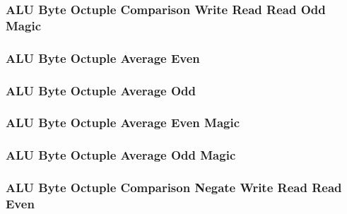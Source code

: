 \subsubsection[{\small ALU Byte Octuple Comparison Write Read Read Odd Magic}]{ALU Byte Octuple Comparison Write Read Read Odd Magic} \label{sec:format-ALU-BOCWRRO.M}



\subsubsection[{\small ALU Byte Octuple Average Even}]{ALU Byte Octuple Average Even} \label{sec:format-ALU-BOAVGE}



\subsubsection[{\small ALU Byte Octuple Average Odd}]{ALU Byte Octuple Average Odd} \label{sec:format-ALU-BOAVGO}



\subsubsection[{\small ALU Byte Octuple Average Even Magic}]{ALU Byte Octuple Average Even Magic} \label{sec:format-ALU-BOAVGE.M}



\subsubsection[{\small ALU Byte Octuple Average Odd Magic}]{ALU Byte Octuple Average Odd Magic} \label{sec:format-ALU-BOAVGO.M}



\subsubsection[{\small ALU Byte Octuple Comparison Negate Write Read Read Even}]{ALU Byte Octuple Comparison Negate Write Read Read Even} \label{sec:format-ALU-BOCNWRRE}

